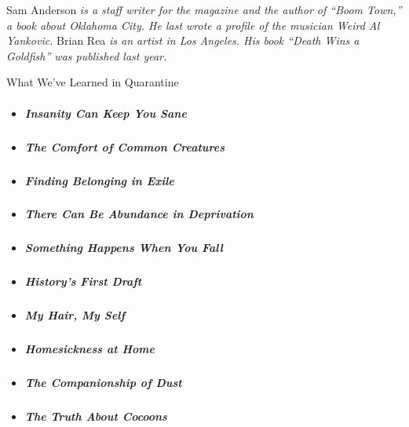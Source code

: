 Sam Anderson \emph{is a staff writer for the magazine and the author of
``Boom Town,'' a book about Oklahoma City. He last wrote a profile of
the musician Weird Al Yankovic.} Brian Rea \emph{is an artist in Los
Angeles. His book ``Death Wins a Goldfish'' was published last year.}

What We've Learned in Quarantine

\begin{itemize}
\item
  \protect\hyperlink{insanity}{}

  \hypertarget{insanity-can-keep-you-sane}{%
  \subparagraph{Insanity Can Keep You
  Sane}\label{insanity-can-keep-you-sane}}
\item
  \protect\hyperlink{nature}{}

  \hypertarget{the-comfort-of-common-creatures}{%
  \subparagraph{The Comfort of Common
  Creatures}\label{the-comfort-of-common-creatures}}
\item
  \protect\hyperlink{paris}{}

  \hypertarget{finding-belonging-in-exile}{%
  \subparagraph{Finding Belonging in
  Exile}\label{finding-belonging-in-exile}}
\item
  \protect\hyperlink{recovery}{}

  \hypertarget{there-can-be-abundance-in-deprivation}{%
  \subparagraph{There Can Be Abundance in
  Deprivation}\label{there-can-be-abundance-in-deprivation}}
\item
  \protect\hyperlink{willi-ruge-photographs}{}

  \hypertarget{something-happens-when-you-fall}{%
  \subparagraph{Something Happens When You
  Fall}\label{something-happens-when-you-fall}}
\item
  \protect\hyperlink{diary}{}

  \hypertarget{historys-first-draft}{%
  \subparagraph{History's First Draft}\label{historys-first-draft}}
\item
  \protect\hyperlink{hair}{}

  \hypertarget{my-hair-my-self}{%
  \subparagraph{My Hair, My Self}\label{my-hair-my-self}}
\item
  \protect\hyperlink{homesickness}{}

  \hypertarget{homesickness-at-home}{%
  \subparagraph{Homesickness at Home}\label{homesickness-at-home}}
\item
  \protect\hyperlink{dusting}{}

  \hypertarget{the-companionship-of-dust}{%
  \subparagraph{The Companionship of
  Dust}\label{the-companionship-of-dust}}
\item
  \protect\hyperlink{cocoons}{}

  \hypertarget{the-truth-about-cocoons}{%
  \subparagraph{The Truth About Cocoons}\label{the-truth-about-cocoons}}
\end{itemize}

